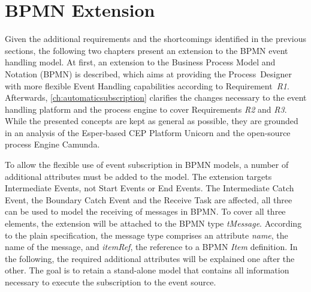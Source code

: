 \section{BPMN Extension}\label{ch:bpmnx}


Given the additional requirements and the shortcomings identified in the previous sections, the following two chapters present an extension to the BPMN event handling model.
At first, an extension to the Business Process Model and Notation (BPMN) is described, which aims at providing the Process~Designer with more flexible Event Handling capabilities according to Requirement~\textit{R1}.
Afterwards, \autoref{ch:automaticsubscription} clarifies the changes necessary to the event handling platform and the process engine to cover Requirements \textit{R2} and \textit{R3}.
While the presented concepts are kept as general as possible, they are grounded in an analysis of the Esper-based CEP Platform Unicorn and the open-source process Engine Camunda.

To allow the flexible use of event subscription in BPMN models, a number of additional attributes must be added to the model. 
The extension targets Intermediate Events, not Start Events or End Events. The Intermediate Catch Event, the Boundary Catch Event and the Receive Task are affected, all three can be used to model the receiving of messages in BPMN.
To cover all three elements, the extension will be attached to the BPMN type \textit{tMessage}. 
According to the plain specification, the message type comprises an attribute \textit{name}, the name of the message, and \textit{itemRef}, the reference to a BPMN \textit{Item} definition. 
In the following, the required additional attributes will be explained one after the other. The goal is to retain a stand-alone model that contains all information necessary to execute the subscription to the event source.


